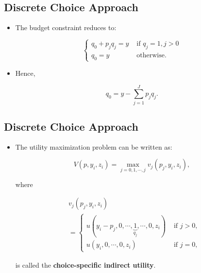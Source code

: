 \documentclass[]{book}
\providecommand{\tightlist}{%
  \setlength{\itemsep}{0pt}\setlength{\parskip}{0pt}}
\begin{document}
\subsection{Discrete Choice Approach}\label{discrete-choice-approach-1}

\begin{itemize}
\tightlist
\item
  The budget constraint reduces to:

  \begin{equation}
  \begin{cases}
  q_0 + p_j q_j = y &\text{   if   } q_j = 1, j > 0\\
  q_0 = y &\text{   otherwise}.
  \end{cases}
  \end{equation}
\item
  Hence,

  \begin{equation}
  q_0 = y - \sum_{j = 1}^J p_j q_j.
  \end{equation}
\end{itemize}

\subsection{Discrete Choice Approach}\label{discrete-choice-approach-2}

\begin{itemize}
\tightlist
\item
  The utility maximization problem can be written as:

  \begin{equation}
  V(p, y_i, z_i) = \max_{j = 0, 1, \cdots, j}  v_j(p_j, y_i, z_i),
  \end{equation}

  where

  \begin{equation}
  \begin{split}
  &v_j(p_j, y_i, z_i)\\
  & =
  \begin{cases}
  u(y_i - p_j, 0, \cdots, \underbrace{1}_{q_j}, \cdots, 0, z_i) &\text{   if  }j > 0,\\
  u(y_i, 0, \cdots, 0, z_i) &\text{   if   }j = 0,
  \end{cases}
  \end{split}
  \end{equation}

  is called the \textbf{choice-specific indirect utility}.
\end{itemize}
\end{document}
